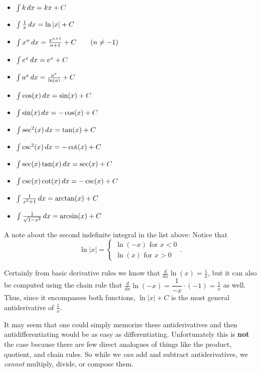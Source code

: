 \documentclass{ximera}
\begin{document}
\begin{theorem}\hfill
\begin{itemize}
\item $\int k \mathop{}\!d x= k x+C$
\item $\int \frac{1}{x} \mathop{}\!d x= \ln|x|+C$
\item $\int x^n \mathop{}\!d x=\frac{x^{n+1}}{n+1}+C\qquad(n\ne-1)$
\item $\int e^x \mathop{}\!d x= e^x + C$
\item $\int a^x \mathop{}\!d x= \frac{a^x}{\ln(a)}+C$
\item $\int \cos(x) \mathop{}\!d x =\sin(x) + C$
\item $\int \sin(x) \mathop{}\!d x =-\cos(x) + C$  
\item $\int \sec^2(x) \mathop{}\!d x = \tan(x) + C$
\item $\int \csc^2(x) \mathop{}\!d x = -\cot(x) + C$
\item $\int \sec(x)\tan(x) \mathop{}\!d x = \sec(x) + C$
\item $\int \csc(x)\cot(x) \mathop{}\!d x = -\csc(x) + C$
\item $\int \frac{1}{x^2+1}\mathop{}\!d x = \arctan(x) + C$
\item $\int \frac{1}{\sqrt{1-x^2}}\mathop{}\!d x= \arcsin(x)+C$
\end{itemize}
\end{theorem}

A note about the second indefinite integral in the list above: Notice that 
\[\ln|x|=\begin{cases} \ln(-x) \mbox{ for } x<0\\\ln(x) \mbox{ for } x> 0\end{cases}.\]

Certainly from basic derivative rules we know that $\frac{d}{dx}\ln(x)=\frac{1}{x}$, but it can also be computed using the chain rule that $\frac{d}{dx}\ln(-x)=\dfrac{1}{-x}\cdot(-1)=\frac{1}{x}$ as well. Thus, since it encompasses both functions, $\ln|x|+C$ is the most general antiderivative of $\frac{1}{x}$.

It may seem that one could simply memorize these antiderivatives and then antidifferentiating would be as easy as differentiating. Unfortunately this is \textbf{not} the case because there are few direct analogues of things like the product, quotient, and chain rules. So while we \emph{can} add and subtract antiderivatives, we \emph{cannot} multiply, divide, or compose them.

\end{document}
